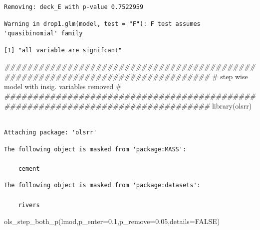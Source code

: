 \documentclass[
  letterpaper,
  DIV=11,
  numbers=noendperiod]{scrartcl}
\newenvironment{Shaded}{\begin{snugshade}}{\end{snugshade}}
\newcommand{\AttributeTok}[1]{\textcolor[rgb]{0.40,0.45,0.13}{#1}}
\newcommand{\CommentTok}[1]{\textcolor[rgb]{0.37,0.37,0.37}{#1}}
\newcommand{\ConstantTok}[1]{\textcolor[rgb]{0.56,0.35,0.01}{#1}}
\newcommand{\DocumentationTok}[1]{\textcolor[rgb]{0.37,0.37,0.37}{\textit{#1}}}
\newcommand{\FloatTok}[1]{\textcolor[rgb]{0.68,0.00,0.00}{#1}}
\newcommand{\FunctionTok}[1]{\textcolor[rgb]{0.28,0.35,0.67}{#1}}
\newcommand{\NormalTok}[1]{\textcolor[rgb]{0.00,0.23,0.31}{#1}}
\begin{document}
\begin{verbatim}
Removing: deck_E with p-value 0.7522959 
\end{verbatim}

\begin{verbatim}
Warning in drop1.glm(model, test = "F"): F test assumes 'quasibinomial' family
\end{verbatim}

\begin{verbatim}
[1] "all variable are signifcant"
\end{verbatim}

\begin{Shaded}
\begin{Highlighting}[]
\DocumentationTok{\#\#\#\#\#\#\#\#\#\#\#\#\#\#\#\#\#\#\#\#\#\#\#\#\#\#\#\#\#\#\#\#\#\#\#\#\#\#\#\#\#\#\#\#\#\#\#\#\#\#\#\#\#\#\#\#\#\#\#\#\#\#\#\#\#\#\#\#\#\#\#\#\#\#\#\#\#\#\#\#}
\CommentTok{\#                step wise model with insig. variables removed                 \# }
\DocumentationTok{\#\#\#\#\#\#\#\#\#\#\#\#\#\#\#\#\#\#\#\#\#\#\#\#\#\#\#\#\#\#\#\#\#\#\#\#\#\#\#\#\#\#\#\#\#\#\#\#\#\#\#\#\#\#\#\#\#\#\#\#\#\#\#\#\#\#\#\#\#\#\#\#\#\#\#\#\#\#\#\#}
\FunctionTok{library}\NormalTok{(olsrr)}
\end{Highlighting}
\end{Shaded}

\begin{verbatim}

Attaching package: 'olsrr'
\end{verbatim}

\begin{verbatim}
The following object is masked from 'package:MASS':

    cement
\end{verbatim}

\begin{verbatim}
The following object is masked from 'package:datasets':

    rivers
\end{verbatim}

\begin{Shaded}
\begin{Highlighting}[]
\FunctionTok{ols\_step\_both\_p}\NormalTok{(lmod,}\AttributeTok{p\_enter=}\FloatTok{0.1}\NormalTok{,}\AttributeTok{p\_remove=}\FloatTok{0.05}\NormalTok{,}\AttributeTok{details=}\ConstantTok{FALSE}\NormalTok{)}
\end{Highlighting}
\end{Shaded}
\end{document}

